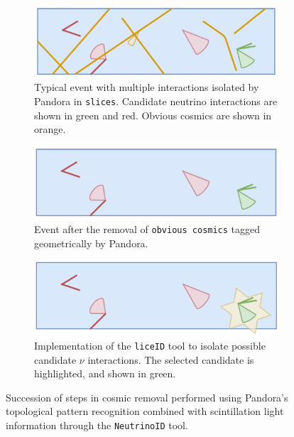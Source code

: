 \begin{figure}[ht] 
\begin{center}
    \begin{subfigure}[b]{0.7\textwidth}
    \centering
    \includegraphics[width=1.00\textwidth]{NuId-Ch3/Images/slice00.png}
    \caption{\label{fig:slcieid:00} Typical event with multiple interactions isolated by Pandora in \texttt{slices}. Candidate neutrino interactions are shown in green and red.  Obvious cosmics are shown in orange.}
    \end{subfigure}
    \begin{subfigure}[b]{0.7\textwidth}
    \centering
    \includegraphics[width=1.00\textwidth]{NuId-Ch3/Images/slice01.png}
    \caption{\label{fig:slcieid:01} Event after the removal of \texttt{obvious cosmics} tagged geometrically by Pandora.}
    \end{subfigure}
    \begin{subfigure}[b]{0.7\textwidth}
    \centering
    \includegraphics[width=1.00\textwidth]{NuId-Ch3/Images/slice02.png}
    \caption{\label{fig:slcieid:02} Implementation of the \texttt{liceID} tool to isolate possible candidate $\nu$ interactions.  The selected candidate is highlighted, and shown in green.}
    \end{subfigure}
\caption{\label{fig:sliceid} Succession of steps in cosmic removal performed using Pandora's topological pattern recognition combined with scintillation light information through the \texttt{NeutrinoID} tool.}
\end{center}
\end{figure}

